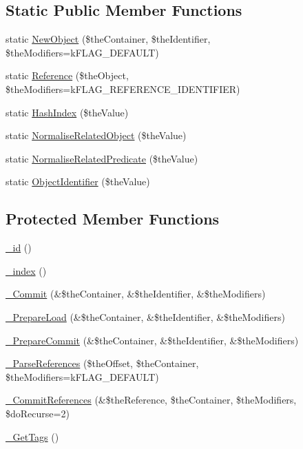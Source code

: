 \subsection*{Static Public Member Functions}
\begin{DoxyCompactItemize}
\item 
static \hyperlink{class_c_persistent_unit_object_ab3e33158e9b08a45f3a0b71feb922f50}{New\-Object} (\$the\-Container, \$the\-Identifier, \$the\-Modifiers=k\-F\-L\-A\-G\-\_\-\-D\-E\-F\-A\-U\-L\-T)
\item 
static \hyperlink{class_c_persistent_unit_object_a45700a911c2266de6e562cdd62c3c777}{Reference} (\$the\-Object, \$the\-Modifiers=k\-F\-L\-A\-G\-\_\-\-R\-E\-F\-E\-R\-E\-N\-C\-E\-\_\-\-I\-D\-E\-N\-T\-I\-F\-I\-E\-R)
\item 
static \hyperlink{class_c_persistent_unit_object_af0e75c386b883074c8bb677bac500bb3}{Hash\-Index} (\$the\-Value)
\item 
static \hyperlink{class_c_persistent_unit_object_abdf69880df0ce8257c4d0fd64adc7053}{Normalise\-Related\-Object} (\$the\-Value)
\item 
static \hyperlink{class_c_persistent_unit_object_ad9c886156b37fa09552de223b1efddd6}{Normalise\-Related\-Predicate} (\$the\-Value)
\item 
static \hyperlink{class_c_persistent_unit_object_ac7bfe8f6475e61abb2e9de9c112cbfe6}{Object\-Identifier} (\$the\-Value)
\end{DoxyCompactItemize}
\subsection*{Protected Member Functions}
\begin{DoxyCompactItemize}
\item 
\hyperlink{class_c_persistent_unit_object_ad1ca0920cf0df3c24351402f9afbf34b}{\-\_\-id} ()
\item 
\hyperlink{class_c_persistent_unit_object_a5166fdce0b1be6a3e4889f20c5f1c2dd}{\-\_\-index} ()
\item 
\hyperlink{class_c_persistent_unit_object_ae8726af138967ed9b4b2edbfa2a188a3}{\-\_\-\-Commit} (\&\$the\-Container, \&\$the\-Identifier, \&\$the\-Modifiers)
\item 
\hyperlink{class_c_persistent_unit_object_a5f41b9143a5ae8fb353989c26d4ee301}{\-\_\-\-Prepare\-Load} (\&\$the\-Container, \&\$the\-Identifier, \&\$the\-Modifiers)
\item 
\hyperlink{class_c_persistent_unit_object_aaa69a5dd56c441027197d5cb677972ad}{\-\_\-\-Prepare\-Commit} (\&\$the\-Container, \&\$the\-Identifier, \&\$the\-Modifiers)
\item 
\hyperlink{class_c_persistent_unit_object_ae74127a9fb936d8cf5aeed30315ac05b}{\-\_\-\-Parse\-References} (\$the\-Offset, \$the\-Container, \$the\-Modifiers=k\-F\-L\-A\-G\-\_\-\-D\-E\-F\-A\-U\-L\-T)
\item 
\hyperlink{class_c_persistent_unit_object_ac5766758d07f7ee985fd2699b8d99fce}{\-\_\-\-Commit\-References} (\&\$the\-Reference, \$the\-Container, \$the\-Modifiers, \$do\-Recurse=2)
\item 
\hyperlink{class_c_persistent_unit_object_ac4df6b15733c79b93493131275a27493}{\-\_\-\-Get\-Tags} ()
\end{DoxyCompactItemize}
